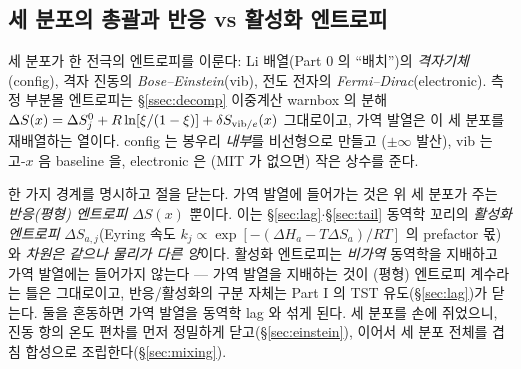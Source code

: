 \subsection{세 분포의 총괄과 반응 vs 활성화 엔트로피}\label{ssec:threedist}
\begin{keybox}
세 분포가 한 전극의 엔트로피를 이룬다: Li 배열(Part 0 의 ``배치'')의 \emph{격자기체}(config), 격자 진동의
\emph{Bose--Einstein}(vib), 전도 전자의 \emph{Fermi--Dirac}(electronic). 측정 부분몰 엔트로피는
\S\ref{ssec:decomp} 이중계산 warnbox 의 분해 $\Delta S(x)=\Delta S^0_j+R\ln[\xi/(1-\xi)]+\delta S_{\mathrm{vib}/e}(x)$
그대로이고, 가역 발열은 이 세 분포를 재배열하는 열이다. config 는 봉우리 \emph{내부}를 비선형으로 만들고
($\pm\infty$ 발산), vib 는 고-$x$ 음 baseline 을, electronic 은 (MIT 가 없으면) 작은 상수를 준다.
\end{keybox}

한 가지 경계를 명시하고 절을 닫는다. 가역 발열에 들어가는 것은 위 세 분포가 주는 \emph{반응(평형) 엔트로피}
$\Delta S(x)$ 뿐이다. 이는 \S\ref{sec:lag}$\cdot$\S\ref{sec:tail} 동역학 꼬리의 \emph{활성화 엔트로피} $\Delta S_{a,j}$(Eyring
속도 $k_j\propto\exp[-(\Delta H_a-T\Delta S_a)/RT]$ 의 prefactor 몫)와 \emph{차원은 같으나 물리가 다른
양}이다. 활성화 엔트로피는 \emph{비가역} 동역학을 지배하고 가역 발열에는 들어가지 않는다 --- 가역 발열을
지배하는 것이 (평형) 엔트로피 계수라는 틀은 \cite{msmr_partI} 그대로이고, 반응/활성화의 구분 자체는
Part I 의 TST 유도(\S\ref{sec:lag})가 닫는다. 둘을 혼동하면 가역 발열을 동역학 lag 와 섞게 된다. 세 분포를 손에 쥐었으니, 진동 항의 온도 편차를 먼저
정밀하게 닫고(\S\ref{sec:einstein}), 이어서 세 분포 전체를 겹침 합성으로 조립한다(\S\ref{sec:mixing}).

